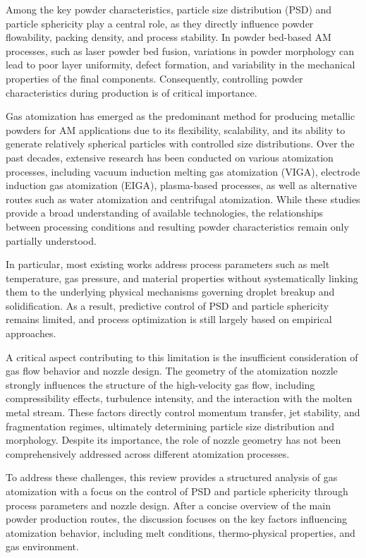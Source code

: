 \documentclass[../main]{subfiles}
\begin{document}
Among the key powder characteristics, particle size distribution (PSD) and particle sphericity play a central role, as they directly influence powder flowability, packing density, and process stability. In powder bed-based AM processes, such as laser powder bed fusion, variations in powder morphology can lead to poor layer uniformity, defect formation, and variability in the mechanical properties of the final components. Consequently, controlling powder characteristics during production is of critical importance.

Gas atomization has emerged as the predominant method for producing metallic powders for AM applications due to its flexibility, scalability, and its ability to generate relatively spherical particles with controlled size distributions. Over the past decades, extensive research has been conducted on various atomization processes, including vacuum induction melting gas atomization (VIGA), electrode induction gas atomization (EIGA), plasma-based processes, as well as alternative routes such as water atomization and centrifugal atomization. While these studies provide a broad understanding of available technologies, the relationships between processing conditions and resulting powder characteristics remain only partially understood.

In particular, most existing works address process parameters such as melt temperature, gas pressure, and material properties without systematically linking them to the underlying physical mechanisms governing droplet breakup and solidification. As a result, predictive control of PSD and particle sphericity remains limited, and process optimization is still largely based on empirical approaches.

A critical aspect contributing to this limitation is the insufficient consideration of gas flow behavior and nozzle design. The geometry of the atomization nozzle strongly influences the structure of the high-velocity gas flow, including compressibility effects, turbulence intensity, and the interaction with the molten metal stream. These factors directly control momentum transfer, jet stability, and fragmentation regimes, ultimately determining particle size distribution and morphology. Despite its importance, the role of nozzle geometry has not been comprehensively addressed across different atomization processes.

To address these challenges, this review provides a structured analysis of gas atomization with a focus on the control of PSD and particle sphericity through process parameters and nozzle design. After a concise overview of the main powder production routes, the discussion focuses on the key factors influencing atomization behavior, including melt conditions, thermo-physical properties, and gas environment.
\end{document}
